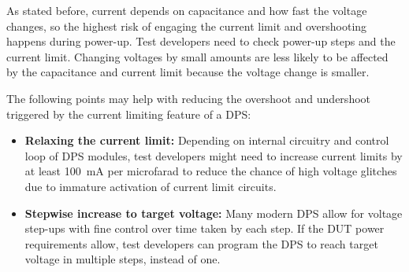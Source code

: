 As stated before, current depends on capacitance and how fast the voltage
changes, so the highest risk of engaging the current limit and overshooting
happens during power-up.
Test developers need to check power-up steps and the current limit.
Changing voltages by small amounts are less likely to be affected by the
capacitance and current limit because the voltage change is smaller.

The following points may help with reducing the overshoot and undershoot
triggered by the current limiting feature of a \ac{DPS}:

\begin{itemize}[topsep=8pt,itemsep=4pt,partopsep=4pt, parsep=4pt]
    \item \textbf{Relaxing the current limit:}
    Depending on internal circuitry and control loop of \ac{DPS} modules, test
    developers might need to increase current limits by at
    least \SI{100}{\milli\ampere} per microfarad to reduce the chance of
    high voltage glitches due to immature activation of current limit circuits.

    \item \textbf{Stepwise increase to target voltage:}
    Many modern \ac{DPS} allow for voltage step-ups with fine control over time
    taken by each step.
    If the \ac{DUT} power requirements allow, test developers can program the
    \ac{DPS} to reach target voltage in multiple steps, instead of one.

\end{itemize}












